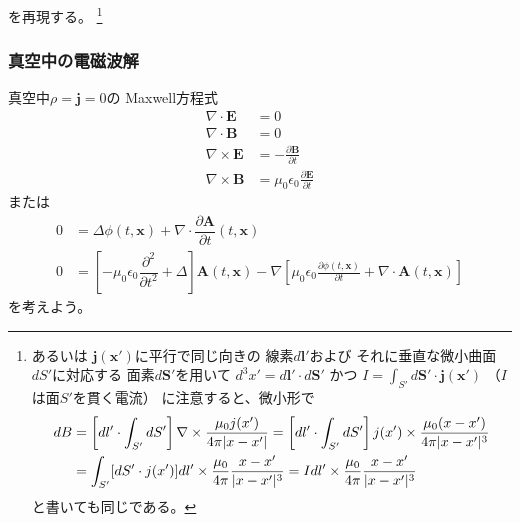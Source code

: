 を再現する。
\footnote{
  あるいは
  $\bm{j}(\bm{x}')$に平行で同じ向きの
  線素$d \bm{l}'$および
  それに垂直な微小曲面$dS'$に対応する
  面素$d \bm{S}'$を用いて
  $d^3 x' = d \bm{l}' \cdot d \bm{S}'$
  かつ
  $I = \int_{S'} d \bm{S}' \cdot \bm{j}(\bm{x}')$
  （$I$は面$S'$を貫く電流）
  に注意すると、微小形で
  \begin{align}
    d B
  &=
    \left[
      d l' \cdot
      \int_{S'} d S'
    \right]
    \nabla \times
      \dfrac{
        \mu_0 j (x')
      }{
        4 \pi
        |x - x'|
      }
  =
    \left[
      d l' \cdot
      \int_{S'} d S'
    \right]
    j (x') \times
      \dfrac{
        \mu_0
        (x - x')
      }{
        4 \pi
        |x - x'|^3
      }
  \notag\\&
  =
    \int_{S'}
      [d S' \cdot j (x')]
    d l' \times
    \dfrac{\mu_0}{4 \pi}
    \dfrac{ x - x' }{ |x - x'|^3 }
    =
    I d l'
    \times
    \dfrac{\mu_0}{4 \pi}
    \dfrac{ x - x' }{ |x - x'|^3 }
    \end{align}
  と書いても同じである。
}

\subsubsection{真空中の電磁波解}

真空中$\rho = \bm{j} = 0$の
Maxwell方程式
\begin{subequations}
\begin{align}
  \nabla \cdot \bm{E}
&=
  0
\\
  \nabla \cdot \bm{B}
&= 0
\\
  \nabla \times \bm{E}
&=
  - \frac{\partial \bm{B}}
    {\partial t}
\\
  \nabla \times \bm{B}
&=
  \mu_0 \epsilon_0
    \frac{\partial \bm{E}}
      {\partial t}
\end{align}
\end{subequations}
または
\begin{subequations}
\begin{align}
  0
&=
    \Delta \phi (t, \bm{x})
  +
    \nabla \cdot
    \dfrac{\partial \bm{A}}
      {\partial t} (t, \bm{x})
\\
  0
&=
  \left[
    - \mu_0 \epsilon_0
    \dfrac{\partial^2}{\partial t^2}
  +
    \Delta
  \right]
    \bm{A} (t, \bm{x})
  -
  \nabla
  \left[
    \mu_0 \epsilon_0
    \frac{\partial \phi (t, \bm{x})}
      {\partial t}
  +
    \nabla \cdot
      \bm{A} (t, \bm{x})
  \right]
\end{align}
\label{maxwell eq of potentials in vacuum}
\end{subequations}
を考えよう。
